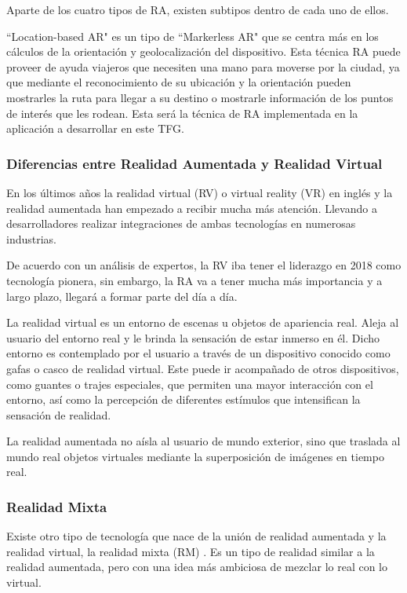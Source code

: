 Aparte de los cuatro tipos de RA, existen subtipos dentro de cada uno de ellos.

``Location-based AR" es un tipo de ``Markerless AR"  que se centra más en los cálculos de la orientación y geolocalización del dispositivo. Esta técnica RA puede proveer de ayuda viajeros que necesiten una mano para moverse por la ciudad, ya que mediante el reconocimiento de su ubicación y la orientación pueden mostrarles la ruta para llegar a su destino o mostrarle información de los puntos de interés que les rodean. Esta será la técnica de RA implementada en la aplicación a desarrollar en este TFG. 


\subsubsection{Diferencias entre Realidad Aumentada y Realidad Virtual}
En los últimos años la realidad virtual (RV) \cite{URL::VR} o virtual reality (VR) en inglés y la realidad aumentada han empezado a recibir mucha más atención. Llevando a desarrolladores realizar integraciones de ambas tecnologías en numerosas industrias.

De acuerdo con un análisis de expertos, la RV iba tener el liderazgo en 2018 como tecnología pionera, sin embargo, la RA va a tener mucha más importancia y a largo plazo, llegará a formar parte del día a día.

La realidad virtual es un entorno de escenas u objetos de apariencia real. Aleja al usuario del entorno real y le brinda la sensación de estar inmerso en él. Dicho entorno es contemplado por el usuario a través de un dispositivo conocido como gafas o casco de realidad virtual. Este puede ir acompañado de otros dispositivos, como guantes o trajes especiales, que permiten una mayor interacción con el entorno, así como la percepción de diferentes estímulos que intensifican la sensación de realidad.

La realidad aumentada no aísla al usuario de mundo exterior, sino que traslada al mundo real objetos virtuales mediante la superposición de imágenes en tiempo real. 

\subsubsection{Realidad Mixta}

Existe otro tipo de tecnología que nace de la unión de realidad aumentada y la realidad virtual, la realidad mixta (RM) \cite{URL::RM}. Es un tipo de realidad similar a la realidad aumentada, pero con una idea más ambiciosa de mezclar lo real con lo virtual.

